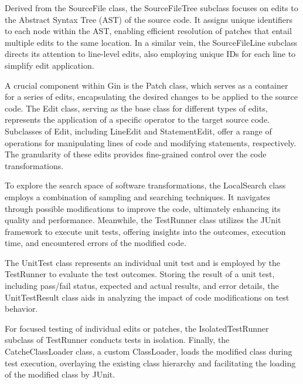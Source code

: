 \vspace{.5em}
Derived from the SourceFile class, the SourceFileTree subclass focuses on edits to the Abstract Syntax Tree (AST) of the source code. It assigns unique identifiers to each node within the AST, enabling efficient resolution of patches that entail multiple edits to the same location. In a similar vein, the SourceFileLine subclass directs its attention to line-level edits, also employing unique IDs for each line to simplify edit application.\par

\vspace{.5em}
A crucial component within Gin is the Patch class, which serves as a container for a series of edits, encapsulating the desired changes to be applied to the source code. The Edit class, serving as the base class for different types of edits, represents the application of a specific operator to the target source code. Subclasses of Edit, including LineEdit and StatementEdit, offer a range of operations for manipulating lines of code and modifying statements, respectively. The granularity of these edits provides fine-grained control over the code transformations.\par

\vspace{.5em}
To explore the search space of software transformations, the LocalSearch class employs a combination of sampling and searching techniques. It navigates through possible modifications to improve the code, ultimately enhancing its quality and performance. Meanwhile, the TestRunner class utilizes the JUnit framework to execute unit tests, offering insights into the outcomes, execution time, and encountered errors of the modified code.\par

\vspace{.5em}
The UnitTest class represents an individual unit test and is employed by the TestRunner to evaluate the test outcomes. Storing the result of a unit test, including pass/fail status, expected and actual results, and error details, the UnitTestResult class aids in analyzing the impact of code modifications on test behavior.\par

\vspace{.5em}
For focused testing of individual edits or patches, the IsolatedTestRunner subclass of TestRunner conducts tests in isolation. Finally, the CatcheClassLoader class, a custom ClassLoader, loads the modified class during test execution, overlaying the existing class hierarchy and facilitating the loading of the modified class by JUnit.\par

